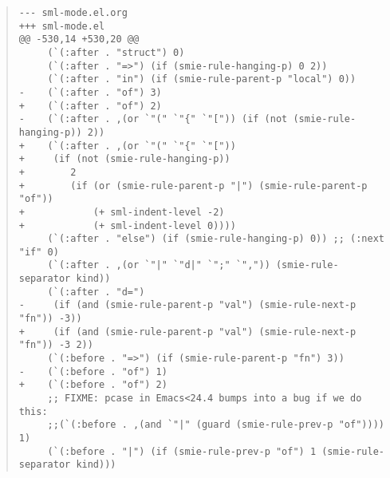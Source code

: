 \documentclass[10pt,b5paper]{article}
\begin{document}
\begin{quote}
\small
\begin{lstlisting}[aboveskip=-\baselineskip]
--- sml-mode.el.org
+++ sml-mode.el
@@ -530,14 +530,20 @@
     (`(:after . "struct") 0)
     (`(:after . "=>") (if (smie-rule-hanging-p) 0 2))
     (`(:after . "in") (if (smie-rule-parent-p "local") 0))
-    (`(:after . "of") 3)
+    (`(:after . "of") 2)
-    (`(:after . ,(or `"(" `"{" `"[")) (if (not (smie-rule-hanging-p)) 2))
+    (`(:after . ,(or `"(" `"{" `"["))
+     (if (not (smie-rule-hanging-p))
+        2
+        (if (or (smie-rule-parent-p "|") (smie-rule-parent-p "of"))
+            (+ sml-indent-level -2)
+            (+ sml-indent-level 0))))
     (`(:after . "else") (if (smie-rule-hanging-p) 0)) ;; (:next "if" 0)
     (`(:after . ,(or `"|" `"d|" `";" `",")) (smie-rule-separator kind))
     (`(:after . "d=")
-     (if (and (smie-rule-parent-p "val") (smie-rule-next-p "fn")) -3))
+     (if (and (smie-rule-parent-p "val") (smie-rule-next-p "fn")) -3 2))
     (`(:before . "=>") (if (smie-rule-parent-p "fn") 3))
-    (`(:before . "of") 1)
+    (`(:before . "of") 2)
     ;; FIXME: pcase in Emacs<24.4 bumps into a bug if we do this:
     ;;(`(:before . ,(and `"|" (guard (smie-rule-prev-p "of")))) 1)
     (`(:before . "|") (if (smie-rule-prev-p "of") 1 (smie-rule-separator kind)))
\end{lstlisting}
\end{quote}







\appendix
\end{document}
